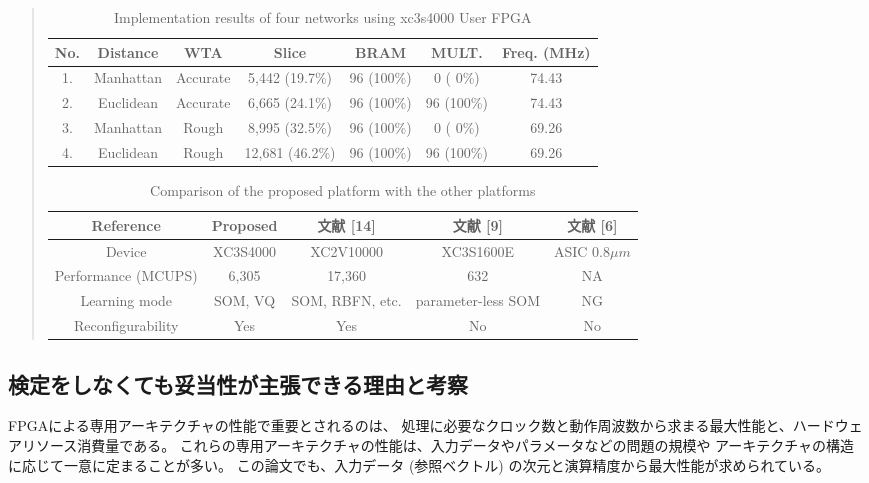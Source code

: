 \documentclass{jsarticle}
\begin{document}
\setcounter{table}{1}
\begin{quotation}
    \begin{table}[h]
        \centering
        \caption{Implementation results of four networks using xc3s4000 User FPGA}
        \label{tbl:resource}
        \begin{tabular}{c|c|c|c|c|c|c}
            \hline
            No. & Distance  & WTA      & Slice           & BRAM       & MULT.      & Freq. (MHz) \\ \hline
            1.  & Manhattan & Accurate &  5,442 (19.7\%) & 96 (100\%) & 0  (  0\%) & 74.43 \\ \hline
            2.  & Euclidean & Accurate &  6,665 (24.1\%) & 96 (100\%) & 96 (100\%) & 74.43 \\ \hline
            3.  & Manhattan & Rough    &  8,995 (32.5\%) & 96 (100\%) & 0  (  0\%) & 69.26 \\ \hline
            4.  & Euclidean & Rough    & 12,681 (46.2\%) & 96 (100\%) & 96 (100\%) & 69.26 \\ \hline
        \end{tabular}
    \end{table}
    \begin{table}[h]
        \centering
        \caption{Comparison of the proposed platform with the other platforms}
        \label{tbl:cmp}
        \begin{tabular}{c|c|c|c|c}
            \hline
            Reference & Proposed & 文献 [14] & 文献 [9] & 文献 [6] \\ \hline
            Device & XC3S4000 &XC2V10000 &XC3S1600E &ASIC 0.8$\mu m$ \\ \hline
            Performance (MCUPS) &6,305 &17,360 &632 &NA \\ \hline
            Learning mode &SOM, VQ &SOM, RBFN, etc. &parameter-less SOM &NG \\ \hline
            Reconfigurability &Yes &Yes &No &No \\ \hline
        \end{tabular}
    \end{table}
\end{quotation}

\subsection*{検定をしなくても妥当性が主張できる理由と考察}
FPGAによる専用アーキテクチャの性能で重要とされるのは、
処理に必要なクロック数と動作周波数から求まる最大性能と、ハードウェアリソース消費量である。
これらの専用アーキテクチャの性能は、入力データやパラメータなどの問題の規模や
アーキテクチャの構造に応じて一意に定まることが多い。
この論文でも、入力データ (参照ベクトル) の次元と演算精度から最大性能が求められている。
\end{document}
